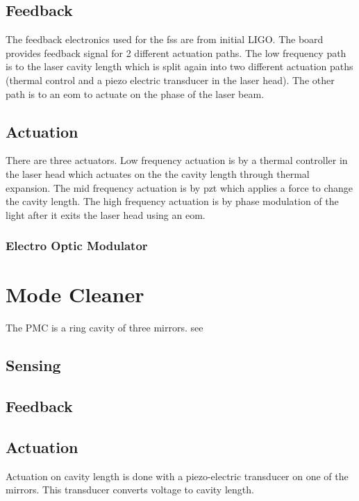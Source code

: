 \subsection{Feedback}
The feedback electronics used for the \ac{fss} are from initial LIGO. The board
provides feedback signal for 2 different actuation paths. The low frequency path
is to the laser cavity length which is split again into two different actuation
paths (thermal control and a piezo electric transducer in the laser head). The
other path is to an \ac{eom} to actuate on the phase of the laser beam.

\subsection{Actuation}

There are three actuators. Low frequency actuation is by a thermal controller in
the laser head which actuates on the the cavity length through thermal expansion.
The mid frequency actuation is by \ac{pzt} which applies a force to change the
cavity length. The high frequency actuation is by phase modulation of the light
after it exits the laser head using an \ac{eom}.


%

\subsubsection{Electro Optic Modulator}

\section{Mode Cleaner}
The PMC is a ring cavity of three mirrors.
see  \cite{Willke:98}


\subsection{Sensing}

\subsection{Feedback}

\subsection{Actuation}
Actuation on cavity length is done with a piezo-electric transducer on one of
the mirrors. This transducer converts voltage to cavity length.


